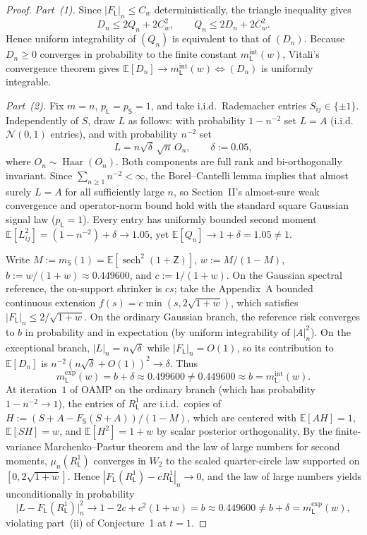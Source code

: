 \documentclass[11pt]{article}
\theoremstyle{plain}
\theoremstyle{definition}
\theoremstyle{remark}
\DeclareMathOperator{\sech}{sech}
\newcommand{\E}{\mathbb{E}}
\newcommand{\sL}{\mathsf{L}}
\newcommand{\sS}{\mathsf{S}}
\newcommand{\sZ}{\mathsf{Z}}
\begin{document}
\begin{proof}
\emph{Part~(1).} Since $|F_{\sL}|_n \le C_w$ deterministically, the triangle inequality gives
\[
D_n \le 2Q_n + 2C_w^2, \qquad Q_n \le 2D_n + 2C_w^2.
\]
Hence uniform integrability of $(Q_n)$ is equivalent to that of $(D_n)$. Because $D_n \ge 0$ converges in probability to the finite constant $m_{\sL}^{\mathrm{int}}(w)$, Vitali's convergence theorem gives $\E[D_n] \to m_{\sL}^{\mathrm{int}}(w) \iff (D_n)$ is uniformly integrable.

\emph{Part~(2).} Fix $m = n$, $p_{\sL} = p_{\sS} = 1$, and take i.i.d.\ Rademacher entries $S_{ij} \in \{\pm 1\}$. Independently of $S$, draw $L$ as follows: with probability $1 - n^{-2}$ set $L = A$ (i.i.d.\ $\mathcal{N}(0, 1)$ entries), and with probability $n^{-2}$ set
\[
L = n\sqrt{\delta}\,\sqrt{n}\,O_n, \qquad \delta := 0.05,
\]
where $O_n \sim \operatorname{Haar}(O_n)$. Both components are full rank and bi-orthogonally invariant. Since $\sum_{n\ge 1} n^{-2} < \infty$, the Borel--Cantelli lemma implies that almost surely $L = A$ for all sufficiently large $n$, so Section~II's almost-sure weak convergence and operator-norm bound hold with the standard square Gaussian signal law ($p_{\sL} = 1$). Every entry has uniformly bounded second moment $\E[L_{ij}^2] = (1 - n^{-2}) + \delta \to 1.05$, yet $\E[Q_n] \to 1 + \delta = 1.05 \neq 1$.

Write $M := m_{\sS}(1) = \E[\sech^2(1 + \sZ)]$, $w := M/(1 - M)$, $b := w/(1 + w) \approx 0.449600$, and $c := 1/(1 + w)$. On the Gaussian spectral reference, the on-support shrinker is $cs$; take the Appendix~A bounded continuous extension $f(s) = c\min(s, 2\sqrt{1+w})$, which satisfies $|F_{\sL}|_n \le 2/\sqrt{1+w}$. On the ordinary Gaussian branch, the reference risk converges to $b$ in probability and in expectation (by uniform integrability of $|A|_n^2$). On the exceptional branch, $|L|_n = n\sqrt{\delta}$ while $|F_{\sL}|_n = O(1)$, so its contribution to $\E[D_n]$ is $n^{-2}(n\sqrt{\delta} + O(1))^2 \to \delta$. Thus
\[
m_{\sL}^{\mathrm{exp}}(w) = b + \delta \approx 0.499600 \neq 0.449600 \approx b = m_{\sL}^{\mathrm{int}}(w).
\]
At iteration~$1$ of OAMP on the ordinary branch (which has probability $1 - n^{-2} \to 1$), the entries of $R_{\sL}^1$ are i.i.d.\ copies of $H := (S + A - F_{\sS}(S+A))/(1 - M)$, which are centered with $\E[AH] = 1$, $\E[SH] = w$, and $\E[H^2] = 1 + w$ by scalar posterior orthogonality. By the finite-variance Marchenko--Pastur theorem and the law of large numbers for second moments, $\mu_n(R_{\sL}^1)$ converges in $W_2$ to the scaled quarter-circle law supported on $[0, 2\sqrt{1+w}]$. Hence $|F_{\sL}(R_{\sL}^1) - cR_{\sL}^1|_n \to 0$, and the law of large numbers yields unconditionally in probability
\[
\bigl|L - F_{\sL}(R_{\sL}^1)\bigr|_n^2 \longrightarrow 1 - 2c + c^2(1 + w) = b \approx 0.449600 \neq b + \delta = m_{\sL}^{\mathrm{exp}}(w),
\]
violating part~(ii) of Conjecture~1 at $t = 1$.


\end{proof}
\end{document}

